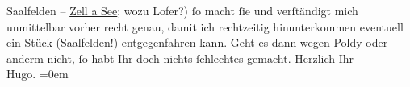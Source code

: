 \begin{ledgroupsized}[t]{13cm}
                  Saalfelden – \uline{Zell a See}; wozu Lofer?) ſo macht ſie und
               verſtändigt {\pb}mich unmittelbar
               vorher \introOben{}recht genau\introOben{}, damit ich rechtzeitig hinunterkommen
               eventuell ein Stück (Saalfelden!)
               entgegenfahren kann. Geht es dann wegen Poldy
               oder anderm nicht, ſo habt Ihr doch nichts ſchlechtes gemacht.\pend
           \pstart
           Herzlich Ihr{\\[\baselineskip]}\spacefill\mbox{Hugo.}\pend
           \leftskip=0em{}
         
         \endnumbering{}\end{ledgroupsized}  \newcommand{\dateiname}{L00703}\newcommand{\titel}{Hugo von Hofmannsthal an Arthur Schnitzler, 16. [7. 1897]}\newcommand{\editorInnen}{Martin Anton Müller und Gerd-Hermann Susen}
      